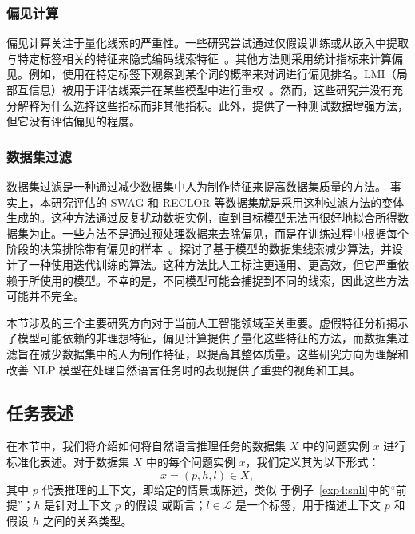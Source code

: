 \subsubsection*{偏见计算}
偏见计算关注于量化线索的严重性。一些研究尝试通过仅假设训练或从嵌入中提取与特定标签相关的特征来隐式编码线索特征~\cite{clark2019don,he2019unlearn,yaghoobzadeh2019robust}。其他方法则采用统计指标来计算偏见。例如，\cite{yu2020reclor}使用在特定标签下观察到某个词的概率来对词进行偏见排名。LMI（局部互信息）被用于评估线索并在某些模型中进行重权~\cite{schuster2019towards}。然而，这些研究并没有充分解释为什么选择这些指标而非其他指标。此外，\cite{Marco2020acl}提供了一种测试数据增强方法，但它没有评估偏见的程度。

\subsubsection*{数据集过滤}
数据集过滤是一种通过减少数据集中人为制作特征来提高数据集质量的方法。
事实上，本研究评估的 SWAG 和 RECLOR 等数据集就是采用这种过滤方法的变体生成的。这种方法通过反复扰动数据实例，直到目标模型无法再很好地拟合所得数据集为止。一些方法不是通过预处理数据来去除偏见，而是在训练过程中根据每个阶段的决策排除带有偏见的样本~\cite{yaghoobzadeh2019robust}。\cite{bras2020adversarial}探讨了基于模型的数据集线索减少算法，并设计了一种使用迭代训练的算法。这种方法比人工标注更通用、更高效，但它严重依赖于所使用的模型。不幸的是，不同模型可能会捕捉到不同的线索，因此这些方法可能并不完全。

本节涉及的三个主要研究方向对于当前人工智能领域至关重要。虚假特征分析揭示了模型可能依赖的非理想特征，偏见计算提供了量化这些特征的方法，而数据集过滤旨在减少数据集中的人为制作特征，以提高其整体质量。这些研究方向为理解和改善 NLP 模型在处理自然语言任务时的表现提供了重要的视角和工具。

\subsection{任务表述}

在本节中，我们将介绍如何将自然语言推理任务的数据集 $X$ 中的问题实例 $x$ 进行标准化表述。对于数据集 $X$ 中的每个问题实例 $x$，我们定义其为以下形式：
\begin{equation}
x = (p, h, l) \in X,
\end{equation}
\noindent
其中 $p$ 代表推理的上下文，即给定的情景或陈述，类似
于例子~\ref{exp4:snli}中的``前提''；$h$ 是针对上下文 $p$ 的假设
或断言；$l \in \mathcal{L}$ 是一个标签，用于描述上下文 $p$ 和假设 $h$ 之间的关系类型。

